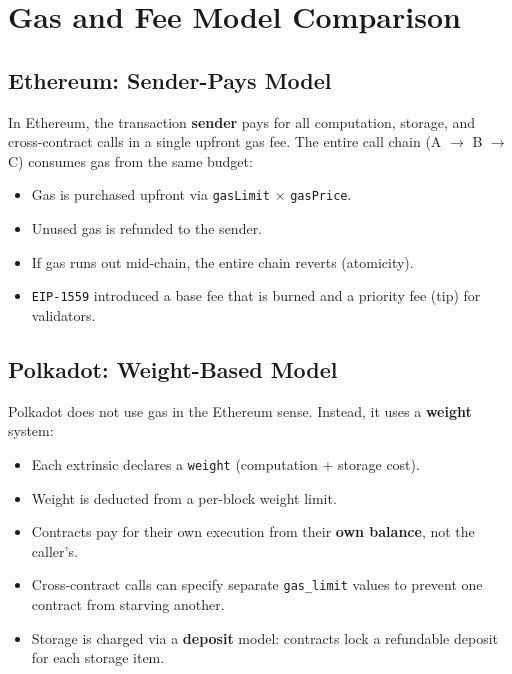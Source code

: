 \section{Gas and Fee Model Comparison}

\subsection{Ethereum: Sender-Pays Model}

In Ethereum, the transaction \textbf{sender} pays for all computation, storage,
and cross-contract calls in a single upfront gas fee. The entire call chain
(A $\to$ B $\to$ C) consumes gas from the same budget:

\begin{itemize}
    \item Gas is purchased upfront via \texttt{gasLimit} $\times$ \texttt{gasPrice}.
    \item Unused gas is refunded to the sender.
    \item If gas runs out mid-chain, the entire chain reverts (atomicity).
    \item \texttt{EIP-1559} introduced a base fee that is burned and a priority
          fee (tip) for validators.
\end{itemize}

\subsection{Polkadot: Weight-Based Model}

Polkadot does not use gas in the Ethereum sense. Instead, it uses a
\textbf{weight} system:

\begin{itemize}
    \item Each extrinsic declares a \texttt{weight} (computation + storage cost).
    \item Weight is deducted from a per-block weight limit.
    \item Contracts pay for their own execution from their \textbf{own balance},
          not the caller's.
    \item Cross-contract calls can specify separate \texttt{gas\_limit} values
          to prevent one contract from starving another.
    \item Storage is charged via a \textbf{deposit} model: contracts lock a
          refundable deposit for each storage item.
\end{itemize}


